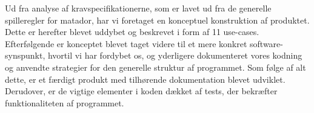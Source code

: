 \documentclass[class=article, crop=false]{standalone}
\begin{document}
    Ud fra analyse af kravspecifikationerne, som er lavet ud fra de generelle spilleregler for matador, har vi foretaget en konceptuel konstruktion af produktet. Dette er herefter blevet uddybet og beskrevet i form af 11 use-cases. Efterfølgende er konceptet blevet taget videre til et mere konkret software-synspunkt, hvortil vi har fordybet os, og yderligere dokumenteret vores kodning og anvendte strategier for den generelle struktur af programmet. Som følge af alt dette, er et færdigt produkt med tilhørende dokumentation blevet udviklet. Derudover, er de vigtige elementer i koden dækket af tests, der bekræfter funktionaliteten af programmet.
\end{document}
